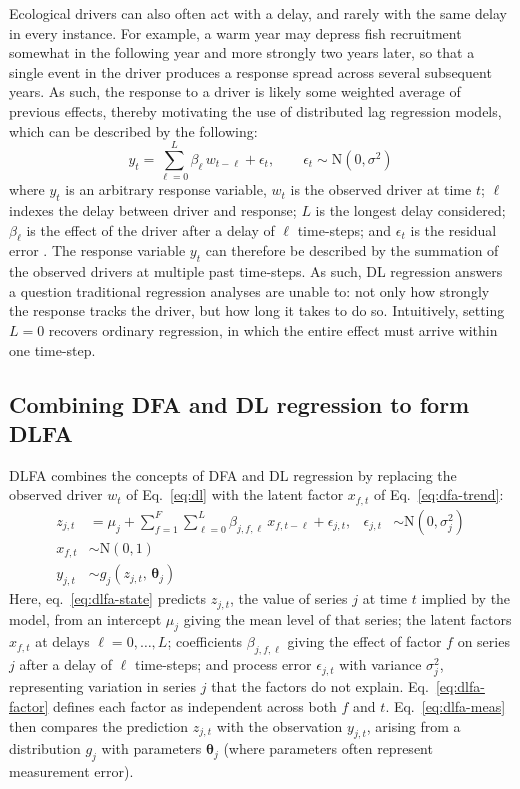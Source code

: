 \documentclass[12pt]{article}
\begin{document}
Ecological drivers can also often act with a delay, and rarely with the
same delay in every instance. For example, a warm year may depress fish
recruitment somewhat in the following year and more strongly two years
later, so that a single event in the driver produces a response spread
across several subsequent years. As such, the response to a driver is
likely some weighted average of previous effects, thereby motivating the
use of distributed lag regression models, which can be described by the
following:
\begin{equation}
  y_t = \sum_{\ell=0}^{L} \beta_\ell\, w_{t-\ell} + \epsilon_t,
  \qquad \epsilon_t \sim \mathrm{N}\!\left(0, \sigma^2\right)
  \label{eq:dl}
\end{equation}
where $y_t$ is an arbitrary response variable, $w_t$ is the observed
driver at time $t$; $\ell$ indexes the delay between driver and
response; $L$ is the longest delay considered; $\beta_\ell$ is the
effect of the driver after a delay of $\ell$ time-steps; and
$\epsilon_t$ is the residual error \citep{miller_adding_2025}. The
response variable $y_t$ can therefore be described by the summation of
the observed drivers at multiple past time-steps. As such, DL regression
answers a question traditional regression analyses are unable to: not
only how strongly the response tracks the driver, but how long it takes
to do so. Intuitively, setting $L = 0$ recovers ordinary regression, in
which the entire effect must arrive within one time-step.

\subsection{Combining DFA and DL regression to form DLFA}
DLFA combines the concepts of DFA and DL regression by replacing the
observed driver $w_t$ of Eq.~\ref{eq:dl} with the latent factor
$x_{f,t}$ of Eq.~\ref{eq:dfa-trend}:
\begin{align}
  z_{j,t} &= \mu_j + \sum_{f=1}^{F}\sum_{\ell=0}^{L}
             \beta_{j,f,\ell}\, x_{f,t-\ell} + \epsilon_{j,t},
  &\epsilon_{j,t} &\sim \mathrm{N}\!\left(0,\sigma_j^2\right)
  \label{eq:dlfa-state} \\
  x_{f,t} &\sim \mathrm{N}(0,1)
  \label{eq:dlfa-factor} \\
  y_{j,t} &\sim g_j\!\left(z_{j,t},\, \boldsymbol\theta_j\right)
  \label{eq:dlfa-meas}
\end{align}
Here, eq.~\ref{eq:dlfa-state} predicts $z_{j,t}$, the value of series
$j$ at time $t$ implied by the model, from an intercept $\mu_j$ giving
the mean level of that series; the latent factors $x_{f,t}$ at delays
$\ell = 0,\dots,L$; coefficients $\beta_{j,f,\ell}$ giving the effect of
factor $f$ on series $j$ after a delay of $\ell$ time-steps; and process
error $\epsilon_{j,t}$ with variance $\sigma_j^2$, representing
variation in series $j$ that the factors do not explain.
Eq.~\ref{eq:dlfa-factor} defines each factor as independent across both
$f$ and $t$. Eq.~\ref{eq:dlfa-meas} then compares the prediction
$z_{j,t}$ with the observation $y_{j,t}$, arising from a distribution
$g_j$ with parameters $\boldsymbol\theta_j$ (where parameters often
represent measurement error).
\end{document}
